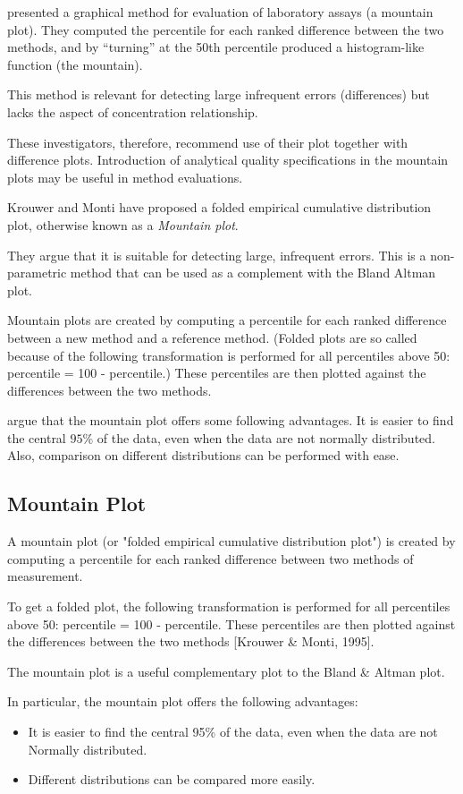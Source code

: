 \documentclass[Main.tex]{subfiles}
\begin{document}
\citet{krouwermonti} presented a graphical method for evaluation of laboratory assays (a mountain plot). 
They computed the percentile for each ranked difference between the two methods, and by “turning” at the 50th percentile 
produced a histogram-like function (the mountain). 

This method is relevant for detecting large infrequent errors (differences) but lacks the aspect of concentration relationship. 

These investigators, therefore, recommend use of their plot together with difference plots. Introduction of analytical quality specifications in the mountain plots may be useful in method evaluations.

Krouwer and Monti have proposed a folded empirical cumulative distribution plot, otherwise known as a \textit{Mountain plot}.
	
They argue that it is suitable for detecting large, infrequent errors. This is a non-parametric method that can be used as a complement with the Bland Altman plot.  

Mountain plots are created by computing a percentile for each ranked difference between a new method and a reference method. (Folded plots are so called because of the following transformation is performed for all percentiles above 50: percentile = 100 - percentile.) These percentiles are then plotted against the differences between the two methods.
	
\citet{krouwermonti} argue that the mountain plot offers some following advantages. It is easier to find the central $95\%$ of the data, even when the data are not normally distributed. Also, comparison on different distributions can be performed with ease.
	

\subsection*{Mountain Plot}
A mountain plot (or "folded empirical cumulative distribution plot") is created by computing a percentile for each ranked difference between two methods of measurement.

To get a folded plot, the following transformation is performed for all percentiles above 50: percentile = 100 - percentile. These percentiles are then plotted against the differences between the two methods [Krouwer \& Monti, 1995].

The mountain plot is a useful complementary plot to the Bland \& Altman plot.

\bigskip
 
In particular, the mountain plot offers the following advantages:
\begin{itemize}
	\item It is easier to find the central 95\% of the data, even when the data are not Normally distributed.
	\item Different distributions can be compared more easily.
	
\end{itemize}



\end{document}
